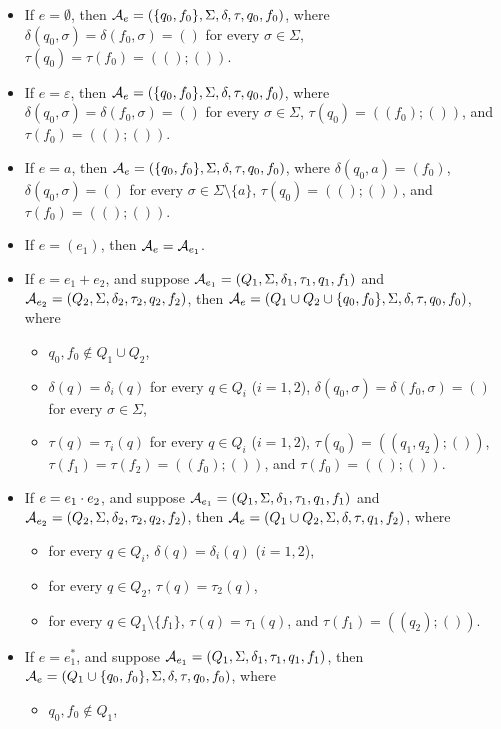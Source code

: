 \begin{itemize}
\item If $e =\emptyset$, then $\mathcal{A}_e = (\{q_0,f_0\}, \Sigma, \delta, \tau, q_0, f_0)$, where $\delta(q_0, \sigma) = \delta(f_0, \sigma) = ()$ for every $\sigma \in \Sigma$, $\tau(q_0) = \tau(f_0)= ((); ())$.

  \item If $e = \varepsilon$, then  $\mathcal{A}_e = (\{q_0, f_0\}, \Sigma, \delta, \tau, q_0, f_0)$, where  $\delta(q_0, \sigma) = \delta(f_0, \sigma) = ()$ for every $\sigma \in \Sigma$, $\tau(q_0) = ((f_0); ())$, and $\tau(f_0) = ((); ())$. 

  \item If $e = a$, then $\mathcal{A}_e = (\{q_0, f_0\}, \Sigma, \delta, \tau, q_0, f_0)$, where  $\delta(q_0, a) = (f_0)$, $\delta(q_0, \sigma) = ()$ for every $\sigma \in \Sigma \setminus \{a\}$, $\tau(q_0) = ((); ())$, and $\tau(f_0) = ((); ())$.
    
  \item If $e = (e_1)$, then $\mathcal{A}_e = \mathcal{A}_{e_1}$.
  
  \item If $e = e_1 + e_2$, and suppose $\mathcal{A}_{e_1} = (Q_1,
  \Sigma, \delta_1, \tau_1, q_1, f_1)$ and $\mathcal{A}_{e_2} = (Q_2, \Sigma,
  \delta_2, \tau_2, q_2, f_2)$, then $\mathcal{A}_e = (Q_1 \cup Q_2 \cup \{q_0, f_0\}, \Sigma,
  \delta, \tau, q_0, f_0)$, where  
  \begin{itemize}
 \item $q_0, f_0 \not \in Q_1 \cup Q_2$, 
 \item $\delta(q) = \delta_i(q)$ for every $q \in Q_i$ ($i=1,2$), 
$\delta(q_0, \sigma) = \delta(f_0, \sigma) = ()$ for every $\sigma \in \Sigma$, 
%
 \item $\tau(q) = \tau_i(q)$ for every $q \in Q_i$ ($i =1,2$), $\tau(q_0) = ((q_1,q_2); ())$,  $\tau(f_1) = \tau(f_2) = ((f_0); ())$, and $\tau(f_0) = ((); ())$.
 \end{itemize}
%
  \item If $e = e_1 \cdot e_2$, and suppose $\mathcal{A}_{e_1} = (Q_1,
  \Sigma, \delta_1, \tau_1, q_1, f_1)$ and $\mathcal{A}_{e_2} = (Q_2, \Sigma,
  \delta_2, \tau_2, q_2, f_2)$, then $\mathcal{A}_e = ( Q_1 \cup Q_2, \Sigma, \delta, \tau, q_1,
  f_2)$, where 
  \begin{itemize}
    \item for every $q \in Q_i$, $\delta(q) = \delta_i(q)$ ($i = 1,2$),
    
    \item for every $q \in Q_2$, $\tau(q) = \tau_2(q)$, 
%
    \item for every $q \in Q_1 \setminus \{f_1\}$, $\tau(q) = \tau_1(q)$, and $\tau(f_1) = ((q_2); ())$.
  \end{itemize}
%  
  \item If $e = e_1^{\ast}$, and suppose  $\mathcal{A}_{e_1} = (Q_1,
  \Sigma, \delta_1, \tau_1, q_1, f_1)$, then $\mathcal{A}_e = (Q_1 \cup \{q_0, f_0\}, \Sigma,
  \delta, \tau, q_0, f_0)$, where 
  \begin{itemize}
  \item $q_0, f_0 \not \in Q_1$,
  

\end{itemize}
\end{itemize}
